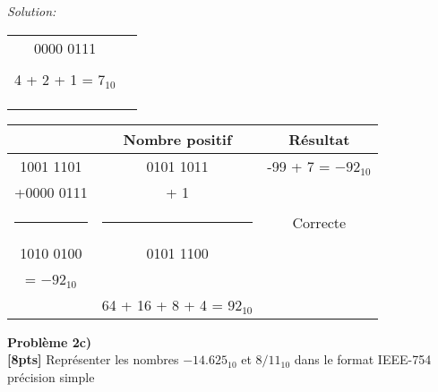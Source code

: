 \documentclass{article}
\newenvironment{problem}[2][Problème]
    { \begin{mdframed}[backgroundcolor=gray!20] \textbf{#1 #2} \\}
    {  \end{mdframed}}
\newenvironment{solution}
    {\textit{Solution:}}
    {}
\begin{document}
\begin{solution}
\begin{enumerate}
        \hspace{40pt}
        
        \begin{tabular}{|c|c|}
        \hline
        &\\
        \hline    
        0000 0111                   &              \\
                                    &          \\
        4 + 2 + 1 = $7_{10}$        &           \\
        \hspace{5pt}                &                 \\
        \hspace{100pt}              &       \hspace{100pt}      \\
                                    &           \\
        \hline
        \end{tabular}
        
        \hspace{40pt}
        
        \begin{tabular}{|c|c|c|}
        \hline
        & Nombre positif & Résultat \\
        \hline
        \hspace{6pt}1001 1101       &     0101 1011        &       -99 + 7 = $-92_{10}$         \\
        +0000 0111                  &     + \hspace{25pt} 1      &                                         \\
        \rule{1in}{1pt}             &     \rule{1in}{1pt}   &       Correcte                          \\
        1010 0100                   &      0101 1100        &                                         \\
        \hspace{33pt} = $-92_{10}$ \hspace{30pt}  &  \hspace{100pt}       &                  \\
                                   &     64 + 16 + 8 + 4 = $92_{10}$       &      \hspace{100pt}                     \\
        \hline
        \end{tabular}    
        
        
    \end{enumerate}    

\end{solution}
\newpage
\begin{problem}{2c)}
\textbf{[8pts]} Représenter les nombres $-14.625_{10}$ et $8/11_{10}$ dans le format IEEE-754 précision simple
\end{problem}
\end{document}
